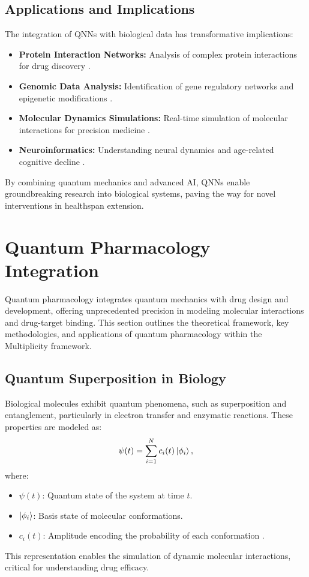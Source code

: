 \documentclass{article}
\theoremstyle{plain}
\begin{document}
\subsection{Applications and Implications}
The integration of QNNs with biological data has transformative implications:
\begin{itemize}
    \item \textbf{Protein Interaction Networks:} Analysis of complex protein interactions for drug discovery \cite{proteinNetworks2023}.
    \item \textbf{Genomic Data Analysis:} Identification of gene regulatory networks and epigenetic modifications \cite{genomicQNN2023}.
    \item \textbf{Molecular Dynamics Simulations:} Real-time simulation of molecular interactions for precision medicine \cite{molecularQNN2022}.
    \item \textbf{Neuroinformatics:} Understanding neural dynamics and age-related cognitive decline \cite{neuroinformatics2023}.
\end{itemize}

By combining quantum mechanics and advanced AI, QNNs enable groundbreaking research into biological systems, paving the way for novel interventions in healthspan extension.


\section{Quantum Pharmacology Integration}
\label{sec:quantum_pharmacology}

Quantum pharmacology integrates quantum mechanics with drug design and development, offering unprecedented precision in modeling molecular interactions and drug-target binding. This section outlines the theoretical framework, key methodologies, and applications of quantum pharmacology within the Multiplicity framework.

\subsection{Quantum Superposition in Biology}
Biological molecules exhibit quantum phenomena, such as superposition and entanglement, particularly in electron transfer and enzymatic reactions. These properties are modeled as:
\begin{equation}
\psi(t) = \sum_{i=1}^{N} c_i(t) \ket{\phi_i},
\end{equation}
where:
\begin{itemize}
    \item $\psi(t)$: Quantum state of the system at time $t$.
    \item $\ket{\phi_i}$: Basis state of molecular conformations.
    \item $c_i(t)$: Amplitude encoding the probability of each conformation \cite{quantumBiology2022}.
\end{itemize}
This representation enables the simulation of dynamic molecular interactions, critical for understanding drug efficacy.
\end{document}

